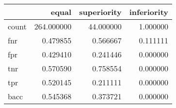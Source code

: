 \begin{tabular}{lrrr}
\toprule
{} &       equal &  superiority &  inferiority \\
\midrule
count &  264.000000 &    44.000000 &     1.000000 \\
fnr   &    0.479855 &     0.566667 &     0.111111 \\
fpr   &    0.429410 &     0.241446 &     0.000000 \\
tnr   &    0.570590 &     0.758554 &     0.000000 \\
tpr   &    0.520145 &     0.211111 &     0.000000 \\
bacc  &    0.545368 &     0.373721 &     0.000000 \\
\bottomrule
\end{tabular}
